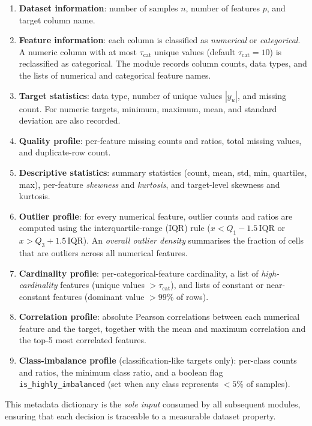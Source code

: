 \documentclass[conference]{IEEEtran}
\begin{document}
   \begin{enumerate}
   \item \textbf{Dataset information}: number of samples $n$, number of features $p$, and target column name.
   \item \textbf{Feature information}: each column is classified as \emph{numerical} or \emph{categorical}. A numeric column with at most $\tau_\text{cat}$ unique values (default $\tau_\text{cat}=10$) is reclassified as categorical. The module records column counts, data types, and the lists of numerical and categorical feature names.
   \item \textbf{Target statistics}: data type, number of unique values $|y_u|$, and missing count. For numeric targets, minimum, maximum, mean, and standard deviation are also recorded.
   \item \textbf{Quality profile}: per-feature missing counts and ratios, total missing values, and duplicate-row count.
   \item \textbf{Descriptive statistics}: summary statistics (count, mean, std, min, quartiles, max), per-feature \emph{skewness} and \emph{kurtosis}, and target-level skewness and kurtosis.
   \item \textbf{Outlier profile}: for every numerical feature, outlier counts and ratios are computed using the interquartile-range (IQR) rule ($x < Q_1 - 1.5\,\text{IQR}$ or $x > Q_3 + 1.5\,\text{IQR}$). An \emph{overall outlier density} summarises the fraction of cells that are outliers across all numerical features.
   \item \textbf{Cardinality profile}: per-categorical-feature cardinality, a list of \emph{high-cardinality} features (unique values $>\tau_\text{cat}$), and lists of constant or near-constant features (dominant value $>99\%$ of rows).
   \item \textbf{Correlation profile}: absolute Pearson correlations between each numerical feature and the target, together with the mean and maximum correlation and the top-5 most correlated features.
   \item \textbf{Class-imbalance profile} (classification-like targets only): per-class counts and ratios, the minimum class ratio, and a boolean flag \texttt{is\_highly\_imbalanced} (set when any class represents $<5\%$ of samples).
   \end{enumerate}

   This metadata dictionary is the \emph{sole input} consumed by all subsequent modules, ensuring that each decision is traceable to a measurable dataset property.
\end{document}
